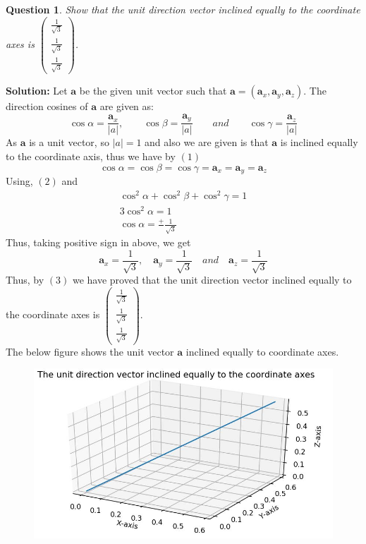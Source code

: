 \documentclass{article}
\newcommand{\solution}{\noindent \textbf{Solution: }}
\newtheorem{question}[theorem]{Question}
\newcommand{\myvec}[1]{\ensuremath{\begin{pmatrix}#1\end{pmatrix}}}
\let\vec\mathbf
\begin{document}
\begin{question}
	Show that the unit direction vector inclined equally to the coordinate axes is $\myvec{\frac{1}{\sqrt{3}} \\ \frac{1}{\sqrt{3}} \\ \frac{1}{\sqrt{3}}}$.
\end{question}
\solution Let $\vec{a}$ be the given unit vector such that $\vec{a} = (\vec{a}_x, \vec{a}_y, \vec{a}_z)$. The direction cosines of $\vec{a}$ are given as:
\begin{equation}
	\cos \alpha = \frac{\vec a_x}{|a|}, \qquad \cos \beta = \frac{\vec a_y}{|a|} \qquad and \qquad \cos \gamma = \frac{\vec a_z}{|a|}
\end{equation}	
As $\vec{a}$ is a unit vector, so $|a|=1$ and also we are given is that $\vec{a}$ is inclined equally to the coordinate axis, thus we have by $(1)$
\begin{equation}
\cos \alpha = \cos \beta =\cos \gamma = \vec a_x = \vec a_y = \vec a_z	
\end{equation}
Using, $(2)$ and
\begin{align*}
\cos^2 \alpha + \cos^2 \beta + \cos^2 \gamma = 1 \\
3\cos^2 \alpha = 1 \\
\cos \alpha = \frac{+}{} \frac{1}{\sqrt{3}}
\end{align*}
Thus, taking positive sign in above, we get	
\begin{equation}
\vec a_x = \frac{1}{\sqrt{3}}, \quad \vec a_y = \frac{1}{\sqrt{3}}  \quad and \quad \vec a_z =\frac{1}{\sqrt{3}}
\end{equation}
Thus, by $(3)$ we have proved that the unit direction vector inclined equally to the coordinate axes is $\myvec{\frac{1}{\sqrt{3}} \\ \frac{1}{\sqrt{3}} \\ \frac{1}{\sqrt{3}}}$. \\
The below figure shows the unit vector $\vec{a}$ inclined equally to coordinate axes.
\begin{figure}[!htb]
	
	\centering
	
	\includegraphics[width=\columnwidth]{assignment1figure.jpg}
	
	\caption{\label{fig1}}
	
	\label{fig:}
	
\end{figure}
\end{document}
